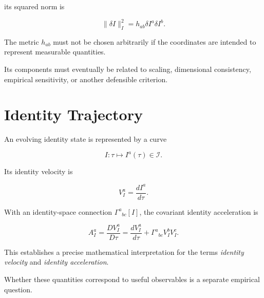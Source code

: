 \documentclass[12pt,oneside]{book}
\begin{document}
its squared norm is

\begin{equation}
    \|\delta I\|_I^2
    =
    h_{ab}
    \delta I^a
    \delta I^b.
    \label{eq:identity-displacement-norm}
\end{equation}

The metric \(h_{ab}\) must not be chosen arbitrarily if the
coordinates are intended to represent measurable quantities.

Its components must eventually be related to scaling,
dimensional consistency, empirical sensitivity, or another
defensible criterion.


\section{Identity Trajectory}
\label{sec:identity-trajectory}

An evolving identity state is represented by a curve

\begin{equation}
    I:
    \tau
    \longmapsto
    I^a(\tau)
    \in
    \mathcal{I}.
    \label{eq:identity-trajectory}
\end{equation}

Its identity velocity is

\begin{equation}
    V_I^a
    =
    \frac{dI^a}{d\tau}.
    \label{eq:identity-velocity}
\end{equation}

With an identity-space connection
\(\Gamma^a{}_{bc}[I]\), the covariant identity acceleration is

\begin{equation}
    A_I^a
    =
    \frac{D V_I^a}{D\tau}
    =
    \frac{dV_I^a}{d\tau}
    +
    \Gamma^a{}_{bc}
    V_I^b V_I^c.
    \label{eq:identity-acceleration}
\end{equation}

This establishes a precise mathematical interpretation for the
terms \emph{identity velocity} and
\emph{identity acceleration}.

Whether these quantities correspond to useful observables is a
separate empirical question.

\end{document}
